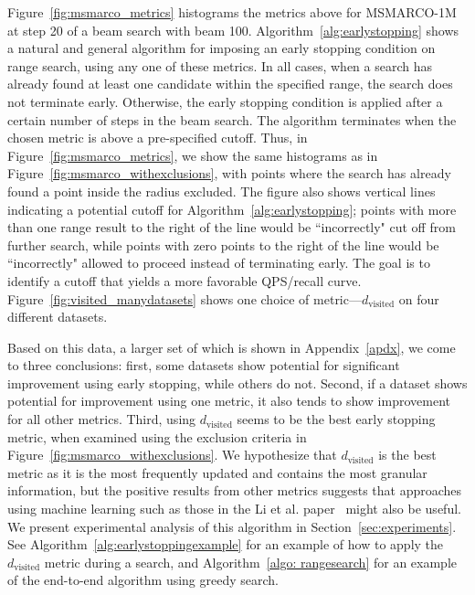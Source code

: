 Figure~\ref{fig:msmarco_metrics} histograms the metrics above for MSMARCO-1M at step 20 of a beam search with beam 100.  Algorithm~\ref{alg:earlystopping} shows a natural and general algorithm for imposing an early stopping condition on range search, using any one of these metrics. In all cases, when a search has already found at least one candidate within the specified range, the search does not terminate early. Otherwise, the early stopping condition is applied after a certain number of steps in the beam search. The algorithm terminates when the chosen metric is above a pre-specified cutoff. Thus, in Figure~\ref{fig:msmarco_metrics}, we show the same histograms as in Figure~\ref{fig:msmarco_withexclusions}, with points where the search has already found a point inside the radius excluded. The figure also shows vertical lines indicating a potential cutoff for Algorithm~\ref{alg:earlystopping}; points with more than one range result to the right of the line would be ``incorrectly" cut off from further search, while points with zero points to the right of the line would be ``incorrectly" allowed to proceed instead of terminating early. The goal is to identify a cutoff that yields a more favorable QPS/recall curve. Figure~\ref{fig:visited_manydatasets} shows one choice of metric---$d_{\text{visited}}$ on four different datasets. 

Based on this data, a larger set of which is shown in Appendix~\ref{apdx}, we come to three conclusions: first, some datasets show potential for significant improvement using early stopping, while others do not. Second, if a dataset shows potential for improvement using one metric, it also tends to show improvement for all other metrics. Third, using $d_{\text{visited}}$ seems to be the best early stopping metric, when examined using the exclusion criteria in Figure~\ref{fig:msmarco_withexclusions}. We hypothesize that $d_{\text{visited}}$ is the best metric as it is the most frequently updated and contains the most granular information, but the positive results from other metrics suggests that approaches using machine learning such as those in the Li et al. paper~\cite{li2020improving} might also be useful. We present experimental analysis of this algorithm in Section~\ref{sec:experiments}. See Algorithm~\ref{alg:earlystoppingexample} for an example of how to apply the $d_{\text{visited}}$ metric during a search, and Algorithm~\ref{algo: rangesearch} for an example of the end-to-end algorithm using greedy search. 





